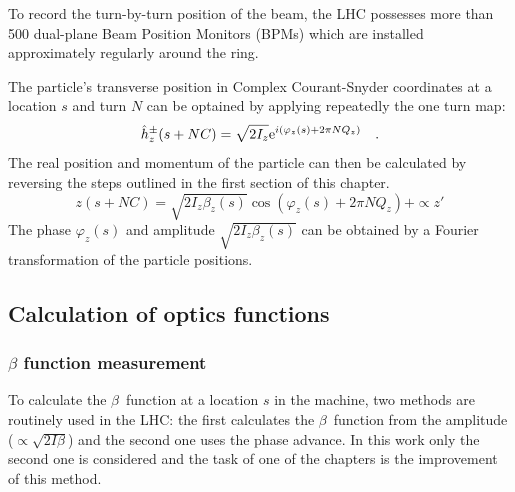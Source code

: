 To record the turn-by-turn position of the beam, the LHC possesses more than 500 dual-plane
Beam Position Monitors (BPMs) which are installed approximately regularly around the ring. 

The particle's transverse position in Complex Courant-Snyder coordinates at a location $s$ and turn
$N$ can be optained by applying repeatedly the one turn map:
%
\begin{equation}
    \hat{h}_z^\pm(s + NC) = \sqrt{2I_z} \text{e}^{i \left( \varphi_z(s) + 2\pi N Q_z\right)} 
    \quad .
\end{equation}
%
The real position and momentum of the particle can then be calculated by reversing the steps outlined
in the first section of this chapter.
%
\begin{equation}
    z(s + NC) = \sqrt{2I_z\beta_z(s)}\cos \left( \varphi_z(s) + 2\pi N Q_z\right) + \propto z'
\end{equation}
%
The phase $\varphi_z(s)$ and amplitude $\sqrt{2I_z\beta_z(s)}$ can be obtained by a Fourier transformation of
the particle positions.

\subsection{Calculation of optics functions}

\subsubsection{$\beta$ function measurement}
\label{sec_beta_meas}

To calculate the $\beta$~function at a location $s$ in the machine, two methods are routinely used
in the LHC: the first calculates the $\beta$~function from the amplitude ($\propto \sqrt{2I\beta}$)
and the second one uses the phase advance.
In this work only the second one is considered and the task of one of the chapters is the improvement
of this method.

